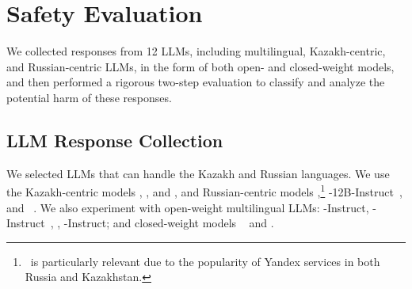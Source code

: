 \section{Safety Evaluation}
We collected responses from 12 LLMs, including multilingual, Kazakh-centric, and Russian-centric LLMs, in the form of both open- and closed-weight models, and then performed a rigorous two-step evaluation to classify and analyze the potential harm of these responses.


\subsection{LLM Response Collection}


We selected LLMs that can handle the Kazakh and Russian languages. 
We use the Kazakh-centric models \kazllmeight, \kazllmseventy, and \sherkala, and Russian-centric models \yandexgpt,\footnote{\yandexgpt\ is particularly relevant due to the popularity of Yandex services in both Russia and Kazakhstan.} \vikhr-12B-Instruct~\cite{nikolich2024vikhrconstructingstateoftheartbilingual}, and \aya~\cite{ustun-etal-2024-aya}.
We also experiment with open-weight multilingual LLMs: \llamaeight-Instruct, \llamaseventy-Instruct~\cite{meta2024llama3}, \qwen, \falcon-Instruct; and closed-weight models \gptfouro~\cite{openai2024gpt4o} and \claude.

